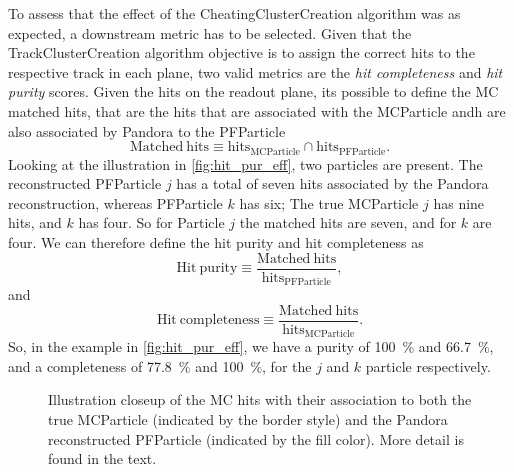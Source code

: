 To assess that the effect of the CheatingClusterCreation algorithm was as expected, a downstream metric has to be selected. Given that the TrackClusterCreation algorithm objective is to assign the correct hits to the respective track in each plane, two valid metrics are the \emph{hit completeness} and \emph{hit purity} scores. Given the hits on the readout plane, its possible to define the MC matched hits, that are the hits that are associated with the MCParticle andh are also associated by Pandora to the PFParticle \begin{equation}
    \mathrm{Matched\ hits} \equiv \mathrm{hits_{MCParticle} \cap hits_{PFParticle}}.
\end{equation} Looking at the illustration in \autoref{fig:hit_pur_eff}, two particles are present. The reconstructed PFParticle $j$ has a total of seven hits associated by the Pandora reconstruction, whereas PFParticle $k$ has six; The true MCParticle $j$ has nine hits, and $k$ has four. So for Particle $j$ the matched hits are seven, and for $k$ are four. We can therefore define the hit purity and hit completeness as \begin{equation}
    \mathrm{Hit\ purity} \equiv \frac{\mathrm{Matched\ hits}}{\mathrm{hits_{PFParticle}}}, 
\end{equation} and \begin{equation}
    \mathrm{Hit\ completeness} \equiv \frac{\mathrm{Matched\ hits}}{\mathrm{hits_{MCParticle}}}. 
\end{equation} So, in the example in \autoref{fig:hit_pur_eff}, we have a purity of \SI{100}{\percent} and \SI{66.7}{\percent}, and a completeness of \SI{77.8}{\percent} and \SI{100}{\percent}, for the $j$ and $k$ particle respectively. 

\begin{figure}
    \centering
    
    \caption[Definition of hit purity and completeness]{Illustration closeup of the MC hits with their association to both the true MCParticle (indicated by the border style) and the Pandora reconstructed PFParticle (indicated by the fill color). More detail is found in the text. }
    \label{fig:hit_pur_eff}
\end{figure}

